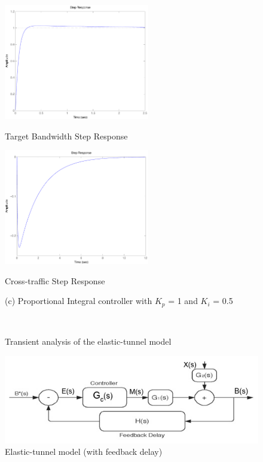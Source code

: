 \documentclass{article}
\begin{document}
\begin{figure}[thbp]
\begin{center}
\begin{minipage}{0.4\textwidth} 
   \includegraphics[width=2.5in]{plots/trans/PI_step_B_1_05.pdf} 
\centerline{Target Bandwidth Step Response}
\end{minipage}
\hspace{1.2cm}
\begin{minipage}{0.4\textwidth} 
   \includegraphics[width=2.5in]{plots/trans/PI_step_x_1_05.pdf} 
\centerline{Cross-traffic Step Response}
\end{minipage}
\centerline{(c) Proportional Integral controller with $K_p$ = 1 and $K_i$ =
0.5}\\
\caption{Transient analysis of the elastic-tunnel model}
\label{fig:trans1} 
\end{center}
\end{figure}

\begin{figure}[tbp]
   \includegraphics[width=5in]{figures/tunnel-block} 
\caption{Elastic-tunnel model (with feedback delay)} 
\label{fig:block2}
\end{figure}
\end{document}

